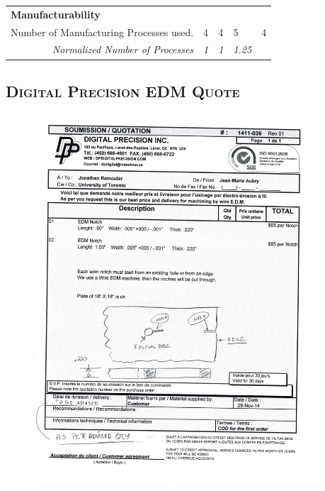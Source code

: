 \documentclass[12pt]{article}
\begin{document}
\begin{table}[h]
{\begin{tabular}{rllll}
\multicolumn{1}{l}{\textbf{Manufacturability}} &                                                                   &                                                                   &                                                                   &                           \\ \cline{1-1}
Number of Manufacturing Processes used.    & 4                                                                 & 4                                                                 & 5                                                                 & 4                         \\
\rowcolor[HTML]{C0C0C0} 
\textit{Normalized Number of Processes}        & \multicolumn{1}{r}{\cellcolor[HTML]{C0C0C0}\textit{1}}            & \multicolumn{1}{r}{\cellcolor[HTML]{C0C0C0}\textit{1}}         & \multicolumn{1}{r}{\cellcolor[HTML]{C0C0C0}\textit{1.25}}         & \textit{}                
\end{tabular}
}
\end{table}

\newpage
\subsection{\textsc{Digital Precision EDM Quote}}


\begin{figure}[h!]
  \centering
  	\includegraphics[width=0.95\textwidth]{quote.pdf}
  \label{fig:quote}
\end{figure}
\end{document}
